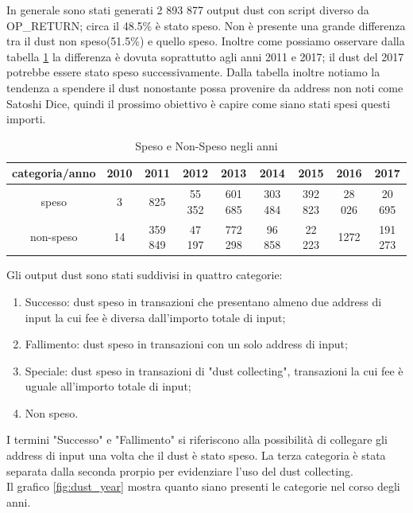 In generale sono stati generati 2 893 877 output dust con script diverso da OP\_RETURN; circa il 48.5\% è stato speso. Non è presente una grande differenza tra il dust non speso(51.5\%) e quello speso. Inoltre come possiamo osservare dalla tabella \ref{tab:dust_spent_unspent} la differenza è dovuta soprattutto agli anni 2011 e 2017; il dust del 2017 potrebbe essere stato speso successivamente. Dalla tabella inoltre notiamo la tendenza a spendere il dust nonostante possa provenire da address non noti come Satoshi Dice, quindi il prossimo obiettivo è capire come siano stati spesi questi importi.
\begin{table}[H]
    \centering
    \begin{tabular}{|c|c|c|c|c|c|c|c|c|}
        \hline
           categoria/anno   & 2010 & 2011 & 2012 & 2013 & 2014 & 2015 & 2016 & 2017\\
        \hline 
         speso &  3 & 825 & 55 352 & 601 685 & 303 484 & 392 823 & 28 026 & 20 695 \\
         \hline
         non-speso & 14 & 359 849 & 47 197 & 772 298 & 96 858 & 22 223 & 1272 & 191 273  \\
         \hline
    \end{tabular}
    \caption{Speso e Non-Speso negli anni}
    \label{tab:dust_spent_unspent}
\end{table}
Gli output dust sono stati suddivisi in quattro categorie:
\begin{enumerate}
    \item Successo: dust speso in transazioni che presentano almeno due address di input la cui fee è diversa dall'importo totale di input;
    \item Fallimento: dust speso in transazioni con un solo address di input;
    \item Speciale: dust speso in transazioni di "dust collecting", transazioni la cui fee è uguale all'importo totale di input;
    \item Non speso.
\end{enumerate}
I termini "Successo" e "Fallimento" si riferiscono alla possibilità di collegare gli address di input una volta che il dust è stato speso. La terza categoria è stata separata dalla seconda prorpio per evidenziare l'uso del dust collecting.\\
Il grafico \ref{fig:dust_year} mostra quanto siano presenti le categorie nel corso degli anni.
